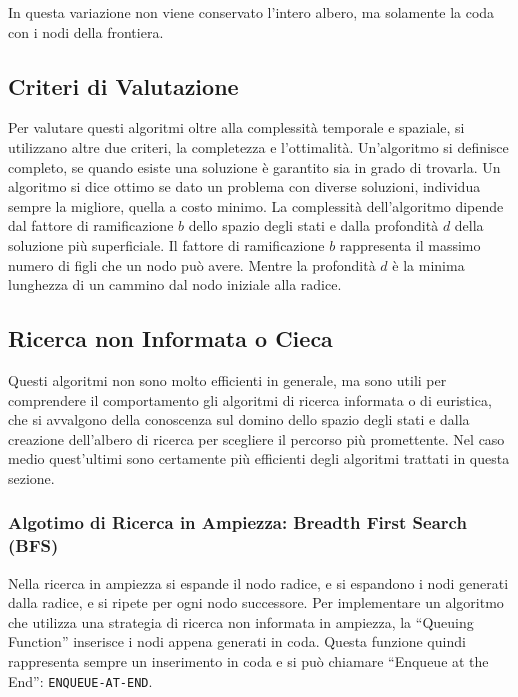 \documentclass{article}
\numberwithin{equation}{subsection}
\begin{document}
In questa variazione non viene conservato l'intero albero, ma solamente la coda con i nodi della 
frontiera. 

\subsection{Criteri di Valutazione}

Per valutare questi algoritmi oltre alla complessità temporale e spaziale, si utilizzano 
altre due criteri, la completezza e l'ottimalità. Un'algoritmo si definisce completo, se 
quando esiste una soluzione è garantito sia in grado di trovarla. Un algoritmo si dice 
ottimo se dato un problema con diverse soluzioni, individua sempre la migliore, quella a costo 
minimo. 
La complessità dell'algoritmo dipende dal fattore di ramificazione $b$ dello spazio degli stati e dalla profondità $d$ 
della soluzione più superficiale. Il fattore di ramificazione $b$ rappresenta il massimo numero di 
figli che un nodo può avere. Mentre la profondità $d$ è la minima lunghezza di un cammino dal 
nodo iniziale alla radice. 

\subsection{Ricerca non Informata o Cieca}
Questi algoritmi non sono molto efficienti in generale, ma sono utili per comprendere il 
comportamento gli algoritmi di ricerca informata o di euristica, che si avvalgono della 
conoscenza sul domino dello spazio degli stati e dalla creazione dell'albero di 
ricerca per scegliere il percorso più promettente. Nel caso medio quest'ultimi sono certamente 
più efficienti degli algoritmi trattati in questa sezione. 

\subsubsection{Algotimo di Ricerca in Ampiezza: Breadth First Search (BFS)}

Nella ricerca in ampiezza si espande il nodo radice, e si espandono i nodi generati dalla 
radice, e si ripete per ogni nodo successore. Per implementare un algoritmo che utilizza una 
strategia di ricerca non informata in ampiezza, la ``Queuing Function'' inserisce i nodi 
appena generati in coda. Questa funzione quindi rappresenta sempre un inserimento in coda 
e si può chiamare ``Enqueue at the End'': \color{magenta}\verb|ENQUEUE-AT-END|\color{black}. 
\end{document}
